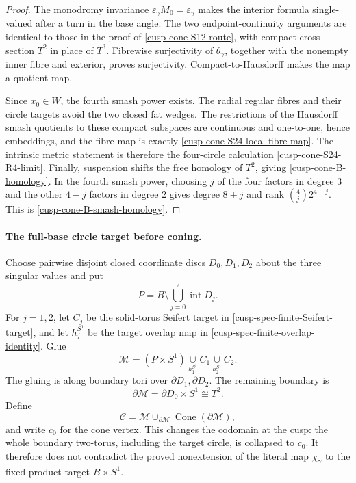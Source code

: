 \begin{proof}
The monodromy invariance
\(\varepsilon_\gamma M_0=\varepsilon_\gamma\) makes the interior formula
single-valued after a turn in the base angle.  The two endpoint-continuity
arguments are identical to those in the proof of
\cref{cusp-cone-S12-route}, with compact cross-section \(T^2\) in place of
\(T^3\).  Fibrewise surjectivity of \(\theta_\gamma\), together with the
nonempty inner fibre and exterior, proves surjectivity.  Compact-to-Hausdorff
makes the map a quotient map.

Since \(x_0\in W\), the fourth smash power exists.  The radial regular
fibres and their circle targets avoid the two closed fat wedges.  The
restrictions of the Hausdorff smash quotients to these compact subspaces are
continuous and one-to-one, hence embeddings, and the fibre map is exactly
\cref{cusp-cone-S24-local-fibre-map}.  The intrinsic metric statement is
therefore the four-circle calculation
\cref{cusp-cone-S24-R4-limit}.  Finally, suspension shifts the free homology
of \(T^2\), giving \cref{cusp-cone-B-homology}.  In the fourth smash power,
choosing \(j\) of the four factors in degree \(3\) and the other
\(4-j\) factors in degree \(2\) gives degree \(8+j\) and rank
\(\binom4j2^{4-j}\).  This is \cref{cusp-cone-B-smash-homology}.
\end{proof}

\paragraph{The full-base circle target before coning.}
Choose pairwise disjoint closed coordinate discs \(D_0,D_1,D_2\) about the
three singular values and put
\begin{equation}
 P=B\setminus\bigcup_{j=0}^2\operatorname{int}D_j.
 \label{cusp-cone-pair-of-pants}
\end{equation}
For \(j=1,2\), let \(C_j\) be the solid-torus Seifert target in
\cref{cusp-spec-finite-Seifert-target}, and let \(h_j^{S^1}\) be the
target overlap map in \cref{cusp-spec-finite-overlap-identity}.  Glue
\begin{equation}
 \mathcal M=(P\times S^1)
 \underset{h_1^{S^1}}{\cup}C_1
 \underset{h_2^{S^1}}{\cup}C_2.
 \label{cusp-cone-M-definition}
\end{equation}
The gluing is along boundary tori over \(\partial D_1,\partial D_2\).
The remaining boundary is
\begin{equation}
 \partial\mathcal M=\partial D_0\times S^1\cong T^2.
 \label{cusp-cone-M-boundary}
\end{equation}
Define
\begin{equation}
 \mathcal C=\mathcal M\cup_{\partial\mathcal M}
 \operatorname{Cone}(\partial\mathcal M),
 \label{cusp-cone-C-definition}
\end{equation}
and write \(c_0\) for the cone vertex.
This changes the codomain at the cusp: the whole boundary two-torus,
including the target circle, is collapsed to \(c_0\).  It therefore does
not contradict the proved nonextension of the literal map
\(\chi_\gamma\) to the fixed product target \(B\times S^1\).

